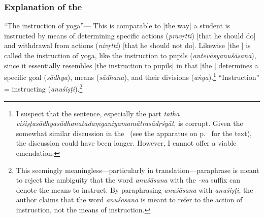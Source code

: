 \subsubsection{Explanation of the \bhasya}
\label{YGNSSM} ``The%
 instruction of yoga''--- This is comparable to [the way] a student is instructed by means of 
determining specific actions (\emph{pravṛtti}) [that he should do] and withdrawal from actions (\emph{nivṛtti}) [that he should not do]. Likewise [the \sastra] is called the instruction of yoga, like the instruction to pupils  (\emph{antevāsyanuśāsana}), since it essentially resembles [the instruction to pupils] in that [the \sastra] determines a specific goal (\emph{sādhya}), means (\emph{sādhana}), and their divisions (\emph{aṅga}).\footnote{I suspect that the sentence, especially the part \emph{tathā viśiṣṭa\-sādhya\-sādhana\-tad\-aṃga\-niyama\-mātra\-sādṛśyāt}, is corrupt.  Given the somewhat similar discussion in the \TaiUBh\ (see the apparatus on p.\ \pageref{TAIUBH111REF} for the text), the discussion could have been longer.  However, I cannot offer a viable emendation.%
}  ``Instruction'' = instructing (\emph{anuśiṣṭi}).\footnote{This seemingly meaningless—particularly in translation—paraphrase is meant to reject the ambiguity that the word \emph{anuśāsana\/} with the \emph{-na\/} suffix can denote the means to instruct.  By paraphrasing \emph{anuśāsana\/} with \emph{anuśiṣṭi}, the author claims that the word \emph{anuśāsana\/} is meant to refer to the action of instruction, not the means of instruction.}
